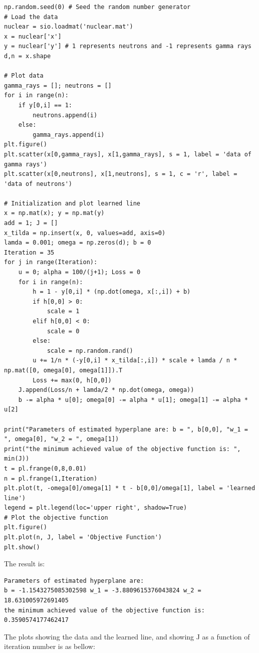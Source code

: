 \documentclass[letterpaper,11pt]{article}
\begin{document}
\begin{spacing}{1.2}
\begin{lstlisting}
np.random.seed(0) # Seed the random number generator
# Load the data
nuclear = sio.loadmat('nuclear.mat')
x = nuclear['x']
y = nuclear['y'] # 1 represents neutrons and -1 represents gamma rays
d,n = x.shape

# Plot data
gamma_rays = []; neutrons = []
for i in range(n):
    if y[0,i] == 1:
        neutrons.append(i)
    else:
        gamma_rays.append(i)
plt.figure()
plt.scatter(x[0,gamma_rays], x[1,gamma_rays], s = 1, label = 'data of gamma rays')
plt.scatter(x[0,neutrons], x[1,neutrons], s = 1, c = 'r', label = 'data of neutrons')

# Initialization and plot learned line
x = np.mat(x); y = np.mat(y)
add = 1; J = []
x_tilda = np.insert(x, 0, values=add, axis=0)
lamda = 0.001; omega = np.zeros(d); b = 0
Iteration = 35
for j in range(Iteration):
    u = 0; alpha = 100/(j+1); Loss = 0
    for i in range(n):
        h = 1 - y[0,i] * (np.dot(omega, x[:,i]) + b)
        if h[0,0] > 0:
            scale = 1
        elif h[0,0] < 0:
            scale = 0
        else:
            scale = np.random.rand()
        u += 1/n * (-y[0,i] * x_tilda[:,i]) * scale + lamda / n * np.mat([0, omega[0], omega[1]]).T
        Loss += max(0, h[0,0])
    J.append(Loss/n + lamda/2 * np.dot(omega, omega))
    b -= alpha * u[0]; omega[0] -= alpha * u[1]; omega[1] -= alpha * u[2]

print("Parameters of estimated hyperplane are: b = ", b[0,0], "w_1 = ", omega[0], "w_2 = ", omega[1])
print("the minimum achieved value of the objective function is: ", min(J))
t = pl.frange(0,8,0.01)
n = pl.frange(1,Iteration)
plt.plot(t, -omega[0]/omega[1] * t - b[0,0]/omega[1], label = 'learned line')
legend = plt.legend(loc='upper right', shadow=True)
# Plot the objective function
plt.figure()
plt.plot(n, J, label = 'Objective Function')
plt.show()
\end{lstlisting}
The result is:
\begin{lstlisting}
Parameters of estimated hyperplane are:
b = -1.1543275085302598 w_1 = -3.8809615376043824 w_2 = 18.631005972691405
the minimum achieved value of the objective function is: 0.3590574177462417
\end{lstlisting}
The plots showing the data and the learned line, and showing J as a function of iteration number is as bellow:


\end{spacing}
\end{document}
